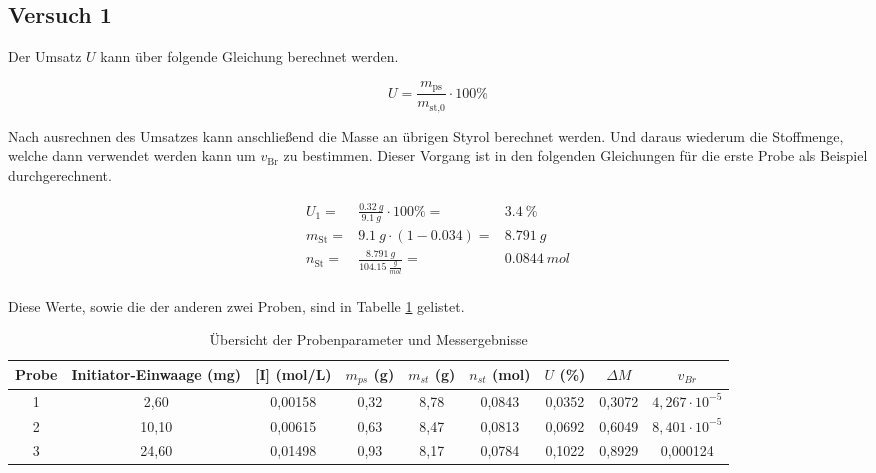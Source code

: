 \documentclass[10pt,a4paper,ngerman]{scrartcl}
\begin{document}
	\subsection{Versuch 1}
		Der Umsatz $U$ kann über folgende Gleichung berechnet werden.

			\begin{equation}
				U = \frac{m_\text{ps}}{m_\text{st,0}} \cdot 100\%
			\end{equation}

		Nach ausrechnen des Umsatzes kann anschließend die Masse an übrigen Styrol berechnet werden.
		Und daraus wiederum die Stoffmenge, welche dann verwendet werden kann um $v_\text{Br}$ zu bestimmen.
		Dieser Vorgang ist in den folgenden Gleichungen für die erste Probe als Beispiel durchgerechnent.

			\begin{eqnarray}
				U_1 =& \frac{\SI{0.32}{g}}{\SI{9.1}{g}} \cdot 100\% =&  \SI{3.4}{\%}\\
				m_\text{St} =& \SI{9.1}{g} \cdot (1 - 0.034) =& \SI{8.791}{g}\\
				n_\text{St} =& \frac{\SI{8.791}{g}}{\SI{104.15}{\frac{g}{mol}}} =& \SI{0.0844}{mol}\\
			\end{eqnarray}

		Diese Werte, sowie die der anderen zwei Proben, sind in Tabelle \ref{Tabelle1} gelistet.

			\begin{table}[ht]
				\centering
				\caption{Übersicht der Probenparameter und Messergebnisse}
				\label{Tabelle1}
				\resizebox{\textwidth}{!}
				{%
				\begin{tabular}{ccccccccc}
					\toprule
					\textbf{Probe} & \textbf{Initiator-Einwaage (mg)} & \textbf{[I] (mol/L)} & \textbf{$m_{ps}$ (g)} & \textbf{$m_{st}$ (g)} & \textbf{$n_{st}$ (mol)} & \textbf{$U$ (\%)} & \textbf{$\Delta M$} & \textbf{$v_{Br}$} \\
					\midrule
					1 & 2,60  & 0,00158 & 0,32 & 8,78 & 0,0843 & 0,0352 & 0,3072 & $4,267 \cdot 10^{-5}$ \\
					2 & 10,10 & 0,00615 & 0,63 & 8,47 & 0,0813 & 0,0692 & 0,6049 & $8,401 \cdot 10^{-5}$ \\
					3 & 24,60 & 0,01498 & 0,93 & 8,17 & 0,0784 & 0,1022 & 0,8929 & 0,000124 \\
					\bottomrule
				\end{tabular}%
				}
		\end{table}
\end{document}

